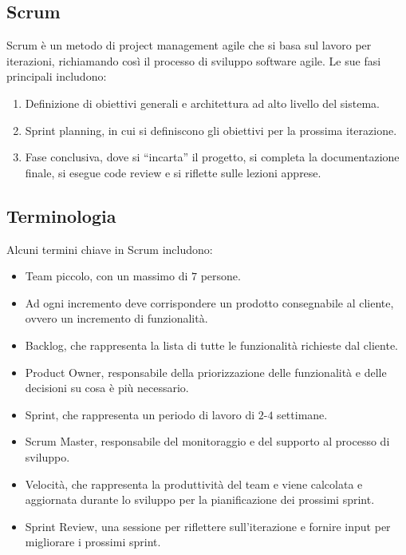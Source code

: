 \subsection{Scrum}
Scrum è un metodo di project management agile che si basa sul lavoro per iterazioni, richiamando così il processo di sviluppo software agile.
Le sue fasi principali includono:

\begin{enumerate}
    \item Definizione di obiettivi generali e architettura ad alto livello del sistema.
    \item Sprint planning, in cui si definiscono gli obiettivi per la prossima iterazione.
    \item Fase conclusiva, dove si ``incarta'' il progetto,
    si completa la documentazione finale, si esegue code review e
    si riflette sulle lezioni apprese.
\end{enumerate}

\subsection{Terminologia}
Alcuni termini chiave in Scrum includono:

\begin{itemize}
    \item Team piccolo, con un massimo di $7$ persone.
    \item Ad ogni incremento deve corrispondere un prodotto consegnabile 
    al cliente, ovvero un incremento di funzionalità.
    \item Backlog, che rappresenta la lista di tutte le funzionalità richieste dal cliente.
    \item Product Owner, responsabile della priorizzazione delle funzionalità e delle decisioni su cosa è più necessario.
    \item Sprint, che rappresenta un periodo di lavoro di $2$-$4$ settimane.
    \item Scrum Master, responsabile del monitoraggio e del supporto al processo di sviluppo.
    \item Velocità, che rappresenta la produttività del team e viene calcolata e aggiornata durante lo sviluppo per la
    pianificazione dei prossimi sprint.
    \item Sprint Review, una sessione per riflettere sull'iterazione e fornire input per migliorare i prossimi sprint.
\end{itemize}

